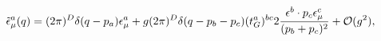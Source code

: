 \begin{equation}
\tilde{\epsilon}^a_\mu(q)=(2\pi)^D\delta(q-p_a)\epsilon^a_\mu+g(2\pi)^D\delta(q-p_b-p_c)
(t^a_G)^{bc}2\frac{\epsilon^b\cdot p_c\epsilon^c_\mu}{(p_b+p_c)^2}+{\cal O}(g^2),
\end{equation}

